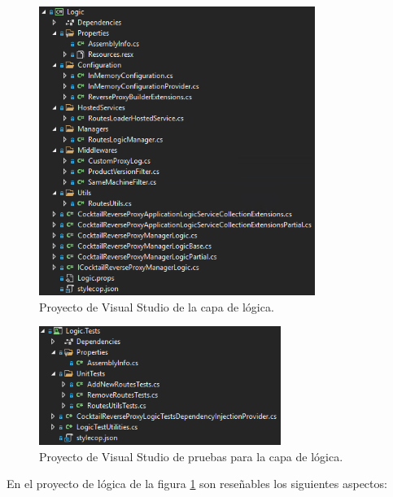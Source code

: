 \documentclass[11pt,spanish,listoffigures]{tfgetsinf}
\begin{document}
\begin{figure}[ht]
\centering
\includegraphics[width=0.8\textwidth]{imagenes/proyectoLogica}
\caption{Proyecto de Visual Studio de la capa de lógica.}
	\label{proyectoLogica}
\end{figure}

\begin{figure}[ht]
\centering
\includegraphics[width=0.7\textwidth]{imagenes/proyectoTestsLogica}
\caption{Proyecto de Visual Studio de pruebas para la capa de lógica.}
	\label{proyectoTestsLogica}
\end{figure}

En el proyecto de lógica de la figura \ref{proyectoLogica} son reseñables los siguientes aspectos:
\end{document}
